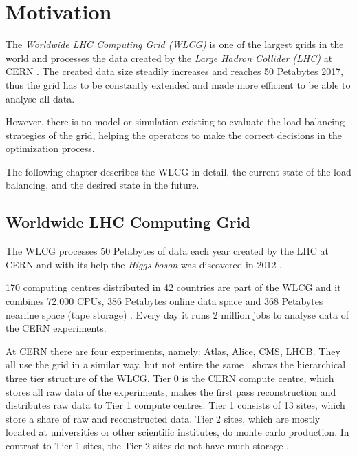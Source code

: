 
\chapter{Motivation}
The \textit{Worldwide LHC Computing Grid (WLCG)} is one of the largest grids in the world and processes the data created by the \textit{Large Hadron Collider (LHC)} at CERN \cite{wlcg_update}. 
The created data size steadily increases and reaches 50 Petabytes 2017, thus the grid has to be constantly extended and made more efficient to be able to analyse all data.

However, there is no model or simulation existing to evaluate the load balancing strategies of the grid,
helping the operators to make the correct decisions in the optimization process.

The following chapter describes the WLCG in detail, the current state of the load balancing, and the desired state in the future.

\section{Worldwide LHC Computing Grid}

The WLCG processes 50 Petabytes of data each year created by the LHC at CERN \cite{data_process}
and with its help the \textit{Higgs boson} was discovered in 2012 \cite{wlcg_online}.

170 computing centres distributed in 42 countries are part of the WLCG and it combines 72.000 CPUs, 386 Petabytes online data space and 368 Petabytes nearline space (tape storage) \cite{wlcg_data}. Every day it runs 2 million jobs to analyse data of the CERN experiments.

At CERN there are four experiments, namely: Atlas, Alice, CMS, LHCB. They all use the grid in a similar way, but not entire the same \cite{wlcg_computing}.  shows the hierarchical three tier structure of the WLCG. Tier 0 is the CERN compute centre, which stores all raw data of the experiments, makes the first pass reconstruction and distributes raw data to Tier 1 compute centres. Tier 1 consists of 13 sites, which store a share of raw and reconstructed data. Tier 2 sites, which are mostly located at universities or other scientific institutes, do monte carlo production. In contrast to Tier 1 sites, the Tier 2 sites do not have much storage \cite{wlcg_computing}.

